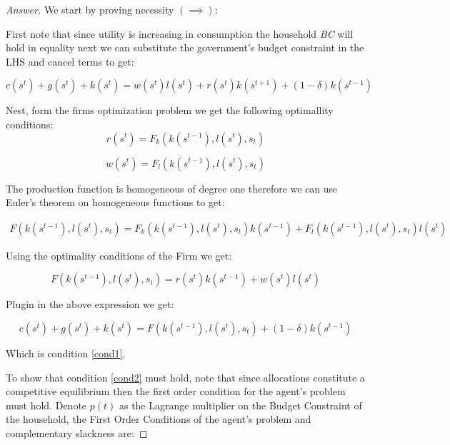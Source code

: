 \documentclass[12pt]{article}
\theoremstyle{definition}
\begin{document}
\begin{proof}[Answer]
We start by proving necessity $(\implies)$:

First note that since utility is increasing in consumption the household \textit{BC} will hold in equality next we can substitute the government's budget constraint in the LHS and cancel terms to get:

$${c}\left({s}^{t}\right)+{g}\left({s}^{{t}}\right)+{k}\left({s}^{{t}}\right)= w(s^t)l(s^t) + r(s^t)k(s^{t+1}) +(1-\delta) {k}\left({s}^{{t}-1}\right)$$

Nest, form the firms optimization problem we get the following optimallity conditions:
\begin{equation}\label{firm1}
r\left(s^{t}\right)=F_{k}\left(k\left(s^{t-1}\right), l\left(s^{t}\right), s_{t}\right)    
\end{equation}

\begin{equation}\label{firm2}
w\left(s^{t}\right)=F_{l}\left(k\left(s^{t-1}\right), l\left(s^{t}\right), s_{t}\right)    
\end{equation}


The production function is homogeneous of degree one therefore we can use Euler's theorem on homogeneous functions to get:

\begin{align*}
F\left(k\left(s^{t-1}\right), l\left(s^{t}\right), s_{t}\right) = F_{k}\left(k\left(s^{t-1}\right), l\left(s^{t}\right), s_{t}\right)k\left(s^{t-1}\right) + F_{l}\left(k\left(s^{t-1}\right), l\left(s^{t}\right), s_{t}\right) l\left(s^{t}\right)
\end{align*}

Using the optimality conditions of the Firm we get:

$$
F\left(k\left(s^{t-1}\right), l\left(s^{t}\right), s_{t}\right) = r\left(s^{t}\right)k\left(s^{t-1}\right) + w\left(s^{t}\right)l\left(s^{t}\right) 
$$

Plugin in the above expression we get:

$${c}\left({s}^{t}\right)+{g}\left({s}^{{t}}\right)+{k}\left({s}^{{t}}\right)={F}\left({k}\left({s}^{{t}-1}\right), {l}\left({s}^{{t}}\right), {s}_{{t}}\right)+(1-\delta) {k}\left({s}^{{t}-1}\right)$$

Which is condition \eqref{cond1}.

To show that condition \eqref{cond2} must hold, note that since allocations constitute a competitive equilibrium then the first order condition for the agent's problem must hold. Denote $p(t)$ as the Lagrange multiplier on the Budget Constraint of the household, the First Order Conditions of the agent's problem and complementary slackness are:


\end{proof}
\end{document}
